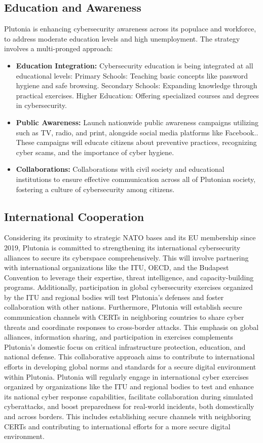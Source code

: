 \documentclass[
	a4paper, %
	10pt, %
]{CSSullivanBusinessReport}
\begin{document}
\begin{fullwidth}
\begin{justify}
\subsection{Education and Awareness}
Plutonia is enhancing cybersecurity awareness across its populace and workforce, to address moderate education levels and high unemployment. The strategy involves a multi-pronged approach:
\begin{itemize}
	\item \textbf{Education Integration:} Cybersecurity education is being integrated at all educational levels: Primary Schools: Teaching basic concepts like password hygiene and safe browsing. Secondary Schools: Expanding knowledge through practical exercises. Higher Education: Offering specialized courses and degrees in cybersecurity.
	\item \textbf{Public Awareness:} Launch nationwide public awareness campaigns utilizing such as TV, radio, and print, alongside social media platforms like Facebook.. These campaigns will educate citizens about preventive practices, recognizing cyber scams, and the importance of cyber hygiene.
	\item \textbf{Collaborations:} Collaborations with civil society and educational institutions to ensure effective communication across all of Plutonian society, fostering a culture of cybersecurity among citizens.
\end{itemize}
\subsection{International Cooperation}
Considering its proximity to strategic NATO bases and its EU membership since 2019, Plutonia is committed to strengthening its international cybersecurity alliances to secure its cyberspace comprehensively. This will involve partnering with international organizations like the ITU, OECD, and the Budapest Convention to leverage their expertise, threat intelligence, and capacity-building programs. Additionally, participation in global cybersecurity exercises organized by the ITU and regional bodies will test Plutonia's defenses and foster collaboration with other nations. Furthermore, Plutonia will establish secure communication channels with CERTs in neighboring countries to share cyber threats and coordinate responses to cross-border attacks. This emphasis on global alliances, information sharing, and participation in exercises complements Plutonia's domestic focus on critical infrastructure protection, education, and national defense. This collaborative approach aims to contribute to international efforts in developing global norms and standards for a secure digital environment within Plutonia. Plutonia will regularly engage in international cyber exercises organized by organizations like the ITU and regional bodies to test and enhance its national cyber response capabilities, facilitate collaboration during simulated cyberattacks, and boost preparedness for real-world incidents, both domestically and across borders. This includes establishing secure channels with neighboring CERTs and contributing to international efforts for a more secure digital environment.


\end{justify}
\end{fullwidth}
\end{document}
